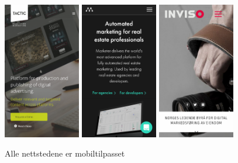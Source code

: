 \begin{figure}[H]
    \begin{center}
        \includegraphics[width=0.3\textwidth]{line/tacticrealtime_com_(iPhone_6_7_8).png}
        \includegraphics[width=0.3\textwidth]{line/marketer_tech_(iPhone_6_7_8).png}
        \includegraphics[width=0.3\textwidth]{line/inviso_no_(iPhone_6_7_8).png}
        \caption{Alle nettstedene er mobiltilpasset}
        \label{fig:competitors-mobile}
    \end{center}
\end{figure}

